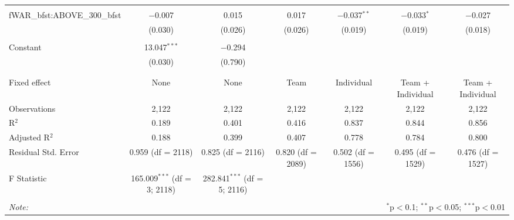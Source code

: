 \begin{table}[!htbp]
\begin{tabular}{@{\extracolsep{5pt}}lcccccc}
  & & & & & & \\
 fWAR\_bfst:ABOVE\_300\_bfst & $-$0.007 & 0.015 & 0.017 & $-$0.037$^{**}$ & $-$0.033$^{*}$ & $-$0.027 \\
  & (0.030) & (0.026) & (0.026) & (0.019) & (0.019) & (0.018) \\
  & & & & & & \\
 Constant & 13.047$^{***}$ & $-$0.294 &  &  &  &  \\
  & (0.030) & (0.790) &  &  &  &  \\
  & & & & & & \\
\hline \\[-1.8ex]
Fixed effect & None & None & Team & Individual & Team + Individual & Team + Individual \\
Observations & 2,122 & 2,122 & 2,122 & 2,122 & 2,122 & 2,122 \\
R$^{2}$ & 0.189 & 0.401 & 0.416 & 0.837 & 0.844 & 0.856 \\
Adjusted R$^{2}$ & 0.188 & 0.399 & 0.407 & 0.778 & 0.784 & 0.800 \\
Residual Std. Error & 0.959 (df = 2118) & 0.825 (df = 2116) & 0.820 (df = 2089) & 0.502 (df = 1556) & 0.495 (df = 1529) & 0.476 (df = 1527) \\
F Statistic & 165.009$^{***}$ (df = 3; 2118) & 282.841$^{***}$ (df = 5; 2116) &  &  &  &  \\
\hline
\hline \\[-1.8ex]
\textit{Note:}  & \multicolumn{6}{r}{$^{*}$p$<$0.1; $^{**}$p$<$0.05; $^{***}$p$<$0.01} \\
\end{tabular}
\end{table}

